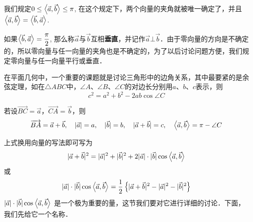 我们规定$0\le \left\langle \vec{a},\vec{b} \right\rangle\le \pi$, 在这个规定下，两个向量的夹角就被唯一确定了，并且$\left\langle \vec{a},\vec{b} \right\rangle=\left\langle \vec{b},\vec{a} \right\rangle$.

\begin{figure}[htp]
    \centering
    \begin{minipage}[t]{0.48\textwidth}
    \centering
    \caption{}
    \end{minipage}
    \begin{minipage}[t]{0.48\textwidth}
    \centering
    \caption{}
    \end{minipage}
  \end{figure}

如果$\left\langle \vec{b},\vec{a} \right\rangle=\dfrac{\pi}{2}$, 那么称$\vec{a}$与$\vec{b}$互相\textbf{垂直}，并记作$\vec{a}\bot \vec{b}$．由于零向量的方向是不确定的，所以零向量与任一向量的夹角也是不确定的，为了以后讨论问题方便，我们规定零向量与任一向量平行或垂直．

在平面几何中，一个重要的课题就是讨论三角形中的边角关系，其中最要紧的是余弦定理，如在$\triangle ABC$中，$\angle A$、$\angle B$、$\angle C$的对边长分别用$a$、$b$、$c$表示，则
\[c^2=a^2+b^2-2ab\cos\angle C\]

若设$\Vec{BC}=\vec{a}$，$\Vec{CA}=\vec{b}$，则
\[\overrightarrow{BA}=\vec{a}+\vec{b},\quad |\vec{a}|=a,\quad |\vec{b}|=b,\quad |\vec{a}+\vec{b}|=c,\quad \left\langle \vec{a},\vec{b} \right\rangle=\pi-\angle C\]

上式换用向量的写法即可写为
\[|\vec{a}+\vec{b}|^2=|\vec{a}|^2+|\vec{b}|^2+2|\vec{a}|\cdot |\vec{b}|\cos\left\langle \vec{a},\vec{b} \right\rangle\]
或
\[|\vec{a}|\cdot |\vec{b}|\cos\left\langle \vec{a},\vec{b} \right\rangle=\dfrac{1}{2}\left\{|\vec{a}+\vec{b}|^2-|\vec{a}|^2-|\vec{b}|^2\right\}\]
$|\vec{a}|\cdot |\vec{b}|\cos\left\langle \vec{a},\vec{b} \right\rangle$
是一个极为重要的量，这节我们要对它进行详细的讨论．下面，我们先给它一个名称．

